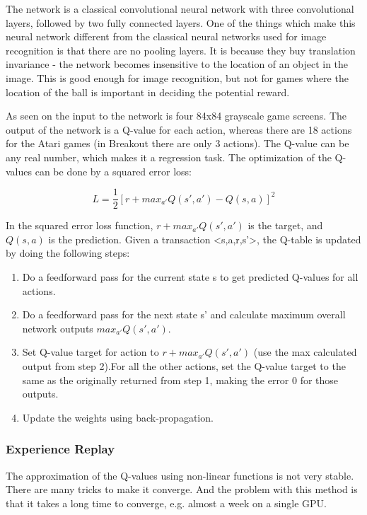 The network is a classical convolutional neural network with three convolutional layers, followed by two fully connected layers. One of the things which make this neural network different from the classical neural networks used for image recognition is that there are no pooling layers. It is because they buy translation invariance -  the network becomes insensitive to the location of an object in the image. This is good enough for image recognition, but not for games where the location of the ball is important in deciding the potential reward.

As seen on  the input to the network is four 84x84 grayscale game screens. The output of the network is a Q-value for each action, whereas there are 18 actions for the Atari games (in Breakout there are only 3 actions). The Q-value can be any real number, which makes it a regression task. The optimization of the Q-values can be done by a squared error loss:

\begin{equation}
L=\frac{1}{2}[r+max_{a'}Q(s',a')-Q(s,a)]^2
\end{equation}  

In the squared error loss function, $r+max_{a'}Q(s',a')$ is the target, and $Q(s,a)$ is the prediction. Given a transaction <s,a,r,s'>, the Q-table is updated by doing the following steps:
\begin{enumerate}
	\item Do a feedforward pass for the current state s to get predicted Q-values for all actions.
	\item Do a feedforward pass for the next state s’ and calculate maximum overall network outputs $max_{a'}Q(s',a')$.
	\item Set Q-value target for action to $r+max_{a'}Q(s',a')$ (use the max calculated output from step 2).For all the other actions, set the Q-value target to the same as the originally returned from step 1, making the error 0 for those outputs. 
	\item Update the weights using back-propagation.
\end{enumerate}

\subsubsection{Experience Replay}
The approximation of the Q-values using non-linear functions is not very stable. There are many tricks to make it converge. And the problem with this method is that it takes a long time to converge, e.g. almost a week on a single GPU.  

